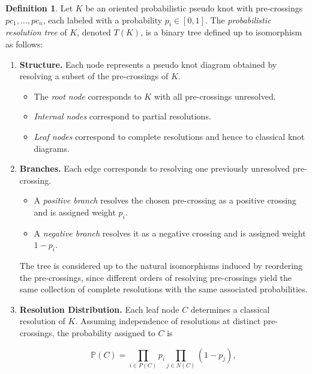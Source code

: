 \documentclass[a4paper, reqno, 12pt]{amsart}
\theoremstyle{plain}
\theoremstyle{definition}
\newtheorem{definition}[theorem]{Definition}
\begin{document}
\begin{definition}\rm
Let $K$ be an oriented probabilistic pseudo knot with pre-crossings $pc_1,\ldots,pc_n$, each labeled with a probability $p_i \in [0,1]$. The \emph{probabilistic resolution tree} of $K$, denoted $T(K)$, is a binary tree defined up to isomorphism as follows:

\begin{enumerate}

\item \textbf{Structure.}
Each node represents a pseudo knot diagram obtained by resolving a subset of the pre-crossings of $K$.

\begin{itemize}
\item The \emph{root node} corresponds to $K$ with all pre-crossings unresolved.

\item \emph{Internal nodes} correspond to partial resolutions.

\item \emph{Leaf nodes} correspond to complete resolutions and hence to classical knot diagrams.
\end{itemize}

\smallbreak

\item \textbf{Branches.}
Each edge corresponds to resolving one previously unresolved pre-crossing.

\begin{itemize}
\item A \emph{positive branch} resolves the chosen pre-crossing as a positive crossing and is assigned weight $p_i$.

\item A \emph{negative branch} resolves it as a negative crossing and is assigned weight $1-p_i$.
\end{itemize}

The tree is considered up to the natural isomorphisms induced by reordering the pre-crossings, since different orders of resolving pre-crossings yield the same collection of complete resolutions with the same associated probabilities.

\smallbreak

\item \textbf{Resolution Distribution.}
Each leaf node $C$ determines a classical resolution of $K$. Assuming independence of resolutions at distinct pre-crossings, the probability assigned to $C$ is

\[
\mathbb{P}(C)
=
\prod_{i \in P(C)} p_i
\prod_{j \in N(C)} (1-p_j),
\]


\end{enumerate}
\end{definition}
\end{document}
